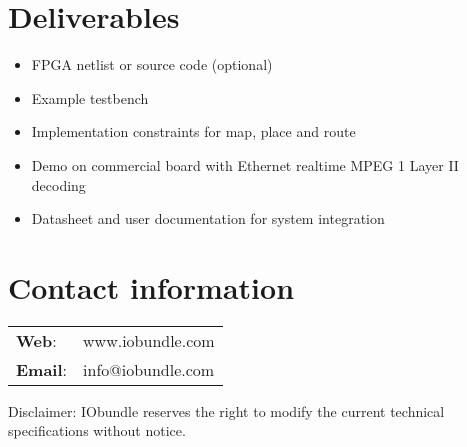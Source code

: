\documentclass[twocolumn]{iob_pb}
\begin{document}
\section*{\textcolor[rgb]{0,0,0}{Deliverables}}
\begin{itemize}
\item FPGA netlist or source code (optional)
\item Example testbench
\item Implementation constraints for map, place and route
\item Demo on commercial board with Ethernet realtime MPEG 1 Layer II decoding
\item Datasheet and user documentation for system integration
\end{itemize}

\section*{\textcolor[rgb]{0,0,0}{Contact information}}
\begin{tabular}[t]{ll}
{\bf Web}:     & www.iobundle.com\\
{\bf Email}:   & info@iobundle.com\\
\end{tabular}

\vspace*{0.5cm}
\noindent
\begin{scriptsize}
Disclaimer: IObundle reserves the right to modify the current
technical specifications without notice.
\end{scriptsize}
\end{document}

